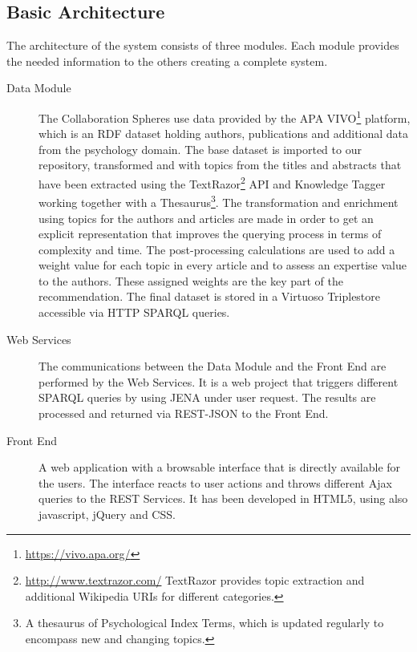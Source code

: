 \subsection{Basic Architecture}
The architecture of the system consists of three modules. Each module provides
the needed information to the others creating a complete system.
\begin{description}
\item[Data Module]The Collaboration Spheres use data provided by the APA VIVO\footnote{\url{https://vivo.apa.org/}} platform\cite{harren_2012}, which is an RDF dataset holding authors, publications and additional data from the psychology domain. The base dataset is imported to our repository, transformed and with topics from the titles and abstracts that have been extracted using the TextRazor\footnote{\url{http://www.textrazor.com/} TextRazor provides topic extraction and additional Wikipedia URIs for different categories.} API and Knowledge Tagger\cite{AlexopoulosVG13} working together with a Thesaurus\footnote{A thesaurus of Psychological Index Terms, which is updated regularly to encompass new and changing topics.}. The transformation and enrichment using topics for the authors and articles are made in order to get an explicit representation that improves the querying process in terms of complexity and time. The post-processing calculations are used to add a weight value for each topic in every article and to assess an expertise value to the authors. These assigned weights are the key part of the recommendation. The final dataset is stored in a Virtuoso Triplestore accessible via HTTP SPARQL queries.
\item[Web Services]The communications between the Data Module and the Front End are performed by the Web Services. It is a web project that triggers different SPARQL queries by using JENA under user request. The results are processed and returned via REST-JSON to the Front End.
\item[Front End]A web application with a browsable interface that is directly available for the users. The interface reacts to user actions and throws different Ajax queries to the REST Services. It has been developed in HTML5, using also javascript, jQuery and CSS. 
\end{description}
\vspace{-5mm}
